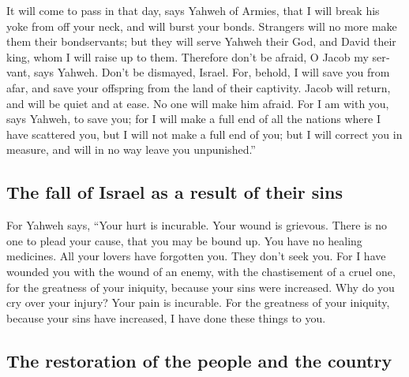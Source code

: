 \begin{paracol}{2}
\begin{otherlanguage}{english}
 It will come to pass in that day, says Yahweh of Armies,
that I will break his yoke from off your neck, and will burst your
bonds. Strangers will no more make them their bondservants;
 but they will serve Yahweh their God, and David their
king, whom I will raise up to them.  Therefore don't be
afraid, O Jacob my servant, says Yahweh. Don't be dismayed, Israel. For,
behold, I will save you from afar, and save your offspring from the land
of their captivity. Jacob will return, and will be quiet and at ease. No
one will make him afraid.  For I am with you, says
Yahweh, to save you; for I will make a full end of all the nations where
I have scattered you, but I will not make a full end of you; but I will
correct you in measure, and will in no way leave you unpunished.''

\hypertarget{the-fall-of-israel-as-a-result-of-their-sins}{%
\subsection{The fall of Israel as a result of their
sins}\label{the-fall-of-israel-as-a-result-of-their-sins}}

 For Yahweh says, ``Your hurt is incurable. Your wound is
grievous.  There is no one to plead your cause, that you
may be bound up. You have no healing medicines.  All your
lovers have forgotten you. They don't seek you. For I have wounded you
with the wound of an enemy, with the chastisement of a cruel one, for
the greatness of your iniquity, because your sins were increased.
 Why do you cry over your injury? Your pain is incurable.
For the greatness of your iniquity, because your sins have increased, I
have done these things to you.

\hypertarget{the-restoration-of-the-people-and-the-country}{%
\subsection{The restoration of the people and the
country}\label{the-restoration-of-the-people-and-the-country}}


\end{otherlanguage}
\end{paracol}
